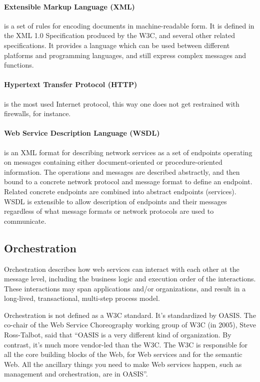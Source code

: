 \paragraph{Extensible Markup Language (XML)}
is a set of rules for encoding documents in machine-readable form. It is defined in the XML 1.0 Specification produced by the W3C, and several other related specifications. It provides a language which can be used between different platforms and programming languages, and still express complex messages and functions.

\paragraph{Hypertext Transfer Protocol (HTTP)} 
is the most used Internet protocol, this way one does not get restrained with firewalls, for instance.

\paragraph{Web Service Description Language (WSDL)}
is an XML format for describing network services as a set of endpoints operating on messages containing either document-oriented or procedure-oriented information. The operations and messages are described abstractly, and then bound to a concrete network protocol and message format to define an endpoint. Related concrete endpoints are combined into abstract endpoints (services). WSDL is extensible to allow description of endpoints and their messages regardless of what message formats or network protocols are used to communicate.

\subsection{Orchestration}
Orchestration describes how web services can interact with each other at the message level, including the business logic and execution order of the interactions. These interactions may span applications and/or organizations, and result in a long-lived, transactional, multi-step process model.

Orchestration is not defined as a W3C standard. It's standardized by OASIS. The co-chair of the Web Service Choreography working group of W3C (in 2005), Steve Ross-Talbot, said that ``OASIS is a very different kind of organization. By contrast, it's much more vendor-led than the W3C. The W3C is responsible for all the core building blocks of the Web, for Web services and for the semantic Web. All the ancillary things you need to make Web services happen, such as management and orchestration, are in OASIS''. \citep{INTERVIEW}

